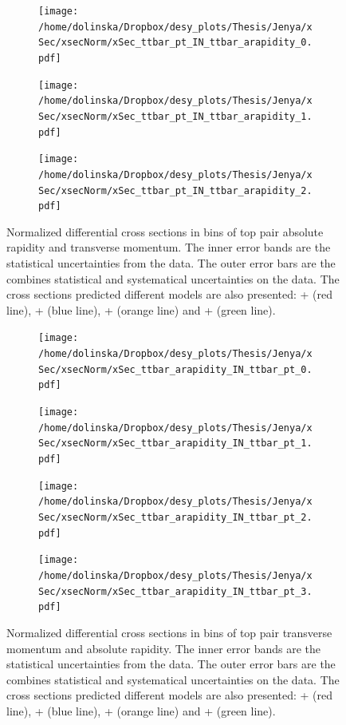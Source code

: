 \begin{figure}[p]
\centering
\begin{subfigure}
  \centering
  \texttt{[image: /home/dolinska/Dropbox/desy\_plots/Thesis/Jenya/xSec/xsecNorm/xSec\_ttbar\_pt\_IN\_ttbar\_arapidity\_0.pdf]}
\end{subfigure}
\begin{subfigure}
  \centering
  \texttt{[image: /home/dolinska/Dropbox/desy\_plots/Thesis/Jenya/xSec/xsecNorm/xSec\_ttbar\_pt\_IN\_ttbar\_arapidity\_1.pdf]}
\end{subfigure}
\begin{subfigure}
  \centering
  \texttt{[image: /home/dolinska/Dropbox/desy\_plots/Thesis/Jenya/xSec/xsecNorm/xSec\_ttbar\_pt\_IN\_ttbar\_arapidity\_2.pdf]}
\end{subfigure}
\caption{Normalized differential cross sections in bins of top pair absolute rapidity and transverse momentum. The inner error bands are the statistical uncertainties from the data.
         The outer error bars are the combines statistical and systematical uncertainties on the data. The cross sections predicted different models are also presented:
         \MG + \PYTHIA (red line), \Powheg + \PYTHIA (blue line), \Powheg + \HERWIG (orange line) and \MCNLO + \HERWIG (green line).}
\label{fig:XS_2D_pttt_ytt}
\end{figure}
\begin{figure}[p]
\centering
\begin{subfigure}
  \centering
  \texttt{[image: /home/dolinska/Dropbox/desy\_plots/Thesis/Jenya/xSec/xsecNorm/xSec\_ttbar\_arapidity\_IN\_ttbar\_pt\_0.pdf]}
\end{subfigure}
\begin{subfigure}
  \centering
  \texttt{[image: /home/dolinska/Dropbox/desy\_plots/Thesis/Jenya/xSec/xsecNorm/xSec\_ttbar\_arapidity\_IN\_ttbar\_pt\_1.pdf]}
\end{subfigure}
\begin{subfigure}
  \centering
  \texttt{[image: /home/dolinska/Dropbox/desy\_plots/Thesis/Jenya/xSec/xsecNorm/xSec\_ttbar\_arapidity\_IN\_ttbar\_pt\_2.pdf]}
\end{subfigure}
\begin{subfigure}
  \centering
  \texttt{[image: /home/dolinska/Dropbox/desy\_plots/Thesis/Jenya/xSec/xsecNorm/xSec\_ttbar\_arapidity\_IN\_ttbar\_pt\_3.pdf]}
\end{subfigure}
\caption{Normalized differential cross sections in bins of top pair transverse momentum and absolute rapidity. The inner error bands are the statistical uncertainties from the data.
         The outer error bars are the combines statistical and systematical uncertainties on the data. The cross sections predicted different models are also presented:
         \MG + \PYTHIA (red line), \Powheg + \PYTHIA (blue line), \Powheg + \HERWIG (orange line) and \MCNLO + \HERWIG (green line).}
\label{fig:XS_2D_pttt_ytt1}
\end{figure}

